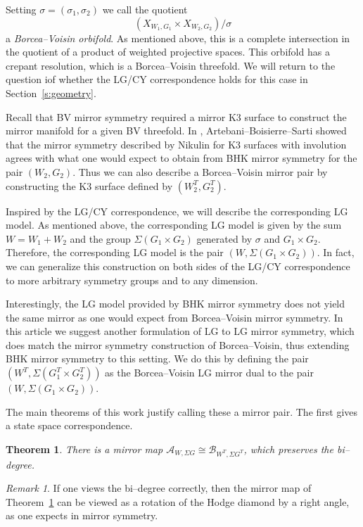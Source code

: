 \documentclass[10pt, letterpaper]{amsart}
\newtheorem{thm}{Theorem}%
\theoremstyle{remark}
\newtheorem{rem}{Remark}[thm]
\newcommand{\sA}{\mathscr{A}}
\newcommand{\sB}{\mathscr{B}}
\newcommand{\s}[1]{\Sigma #1}
\DeclareMathOperator{\SL}{SL}
\begin{document}
Setting $\sigma=(\sigma_1,\sigma_2)$ we call the quotient 
\[
(X_{W_1,G_1}\times X_{W_2,G_2})/\sigma 
\]
a \emph{Borcea--Voisin orbifold}. As mentioned above, this is a complete intersection in the quotient of a product of weighted projective spaces. This orbifold has a crepant resolution, which is a Borcea--Voisin threefold. We will return to the question iof whether the LG/CY correspondence holds for this case in Section~\ref{s:geometry}.

Recall that BV mirror symmetry required a mirror K3 surface to construct the mirror manifold for a given BV threefold. In \cite{involutions}, Artebani--Boisierre--Sarti showed that the mirror symmetry described by Nikulin for K3 surfaces with involution agrees with what one would expect to obtain from BHK mirror symmetry for the pair $(W_2,G_2)$. Thus we can also describe a Borcea--Voisin mirror pair by constructing the K3 surface defined by $(W_2^T, G_2^T)$. 

Inspired by the LG/CY correspondence, we will describe the corresponding LG model. As mentioned above, the corresponding LG model is given by the sum $W=W_1+W_2$ and the group $\s{(G_1\times G_2)}$ generated by $\sigma$ and $G_1\times G_2$. Therefore, the corresponding LG model is the pair $(W, \s{(G_1\times G_2)})$. In fact, we can generalize this construction on both sides of the LG/CY correspondence to more arbitrary symmetry groups and to any dimension.

Interestingly, the LG model provided by BHK mirror symmetry does not yield the same mirror as one would expect from Borcea--Voisin mirror symmetry. In this article we suggest another formulation of LG to LG mirror symmetry, which does match the mirror symmetry construction of Borcea--Voisin, thus extending BHK mirror symmetry to this setting. We do this by defining the pair $(W^T,\s{(G_1^T\times G_2^T)})$ as the Borcea--Voisin LG mirror dual to the pair $(W, \s{(G_1\times G_2)})$.

The main theorems of this work justify calling these a mirror pair. The first gives a state space correspondence. 

\begin{thm}\label{t:BViso}
There is a mirror map $\sA_{W,\s{G}}\cong \sB_{W^T,\s{G^T}}$, which preserves the bi--degree. 
\end{thm}

\begin{rem}
	If one views the bi--degree correctly, then the mirror map of Theorem~\ref{t:BViso} can be viewed as a rotation of the Hodge diamond by a right angle, as one expects in mirror symmetry.
\end{rem}
\end{document}
